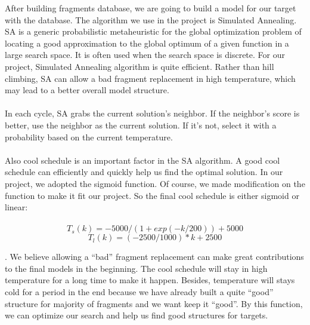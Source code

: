 \documentclass{article}
\begin{document}
\begin{enumerate}
After building fragments database, we are going to build a model for our target with the database. The algorithm we use in the project is Simulated Annealing. SA is a generic probabilistic metaheuristic for the global optimization problem of locating a good approximation to the global optimum of a given function in a large search space. It is often used when the search space is discrete. For our project, Simulated Annealing algorithm is quite efficient. Rather than hill climbing, SA can allow a bad fragment replacement in high temperature, which may lead to a better overall model structure. \\\\
In each cycle, SA grabs the current solution’s neighbor. If the neighbor’s score is better, use
the neighbor as the current solution. If it’s not, select it with a probability based on the current temperature.\\\\
     Also cool schedule is an important factor in the SA algorithm. A good cool schedule can efficiently and quickly help us find the optimal solution. In our project, we adopted the sigmoid function. Of course, we made modification on the function to make it fit our project. So the final cool schedule is either sigmoid or linear:\\\\
\begin{equation*}
      T_s(k) =  -5000/(1+ exp(-k/200))+5000
    \end{equation*}
\begin{equation*}
      T_l(k) =  (-2500/1000)*k + 2500
    \end{equation*}

. We believe allowing a “bad” fragment replacement can make great contributions to the final models in the beginning. The cool schedule will stay in high temperature for a long time to make it happen. Besides, temperature will stays cold for a period in the end because we have already built a quite “good” structure for majority of fragments and we want keep it “good”. By this function, we can optimize our search and help us find good structures for targets.



\end{enumerate}
\end{document}
